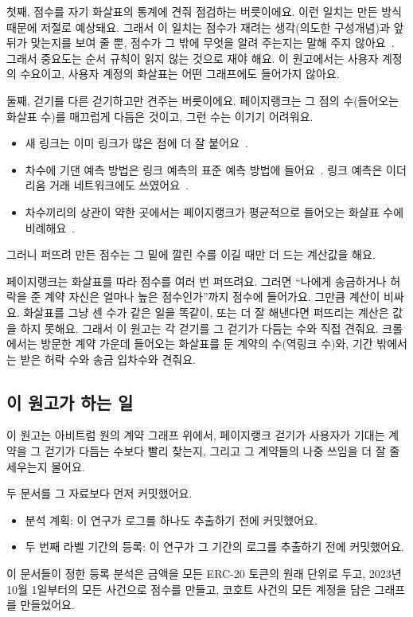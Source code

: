 첫째, 점수를 자기 화살표의 통계에 견줘 점검하는 버릇이에요. 이런 일치는 만든 방식 때문에 저절로 예상돼요. 그래서 이 일치는 점수가 재려는 생각(의도한 구성개념)과 앞뒤가 맞는지를 보여 줄 뿐, 점수가 그 밖에 무엇을 알려 주는지는 말해 주지 않아요~\cite{cronbach1955construct,messick1995validity}. 그래서 중요도는 순서 규칙이 읽지 않는 것으로 재야 해요. 이 원고에서는 사용자 계정의 수요이고, 사용자 계정의 화살표는 어떤 그래프에도 들어가지 않아요.

둘째, 걷기를 다른 걷기하고만 견주는 버릇이에요. 페이지랭크는 그 점의 수(들어오는 화살표 수)를 매끄럽게 다듬은 것이고, 그런 수는 이기기 어려워요.
\begin{itemize}
\item 새 링크는 이미 링크가 많은 점에 더 잘 붙어요~\cite{barabasi1999scaling,newman2001clustering}.
\item 차수에 기댄 예측 방법은 링크 예측의 표준 예측 방법에 들어요~\cite{libennowell2007link}. 링크 예측은 이더리움 거래 네트워크에도 쓰였어요~\cite{lin2022tracking}.
\item 차수끼리의 상관이 약한 곳에서는 페이지랭크가 평균적으로 들어오는 화살표 수에 비례해요~\cite{fortunato2008indegree}.
\end{itemize}
그러니 퍼뜨려 만든 점수는 그 밑에 깔린 수를 이길 때만 더 드는 계산값을 해요.

\begin{puri}
페이지랭크는 화살표를 따라 점수를 여러 번 퍼뜨려요. 그러면 “나에게 송금하거나 허락을 준 계약 자신은 얼마나 높은 점수인가”까지 점수에 들어가요. 그만큼 계산이 비싸요. 화살표를 그냥 센 수가 같은 일을 똑같이, 또는 더 잘 해낸다면 퍼뜨리는 계산은 값을 하지 못해요. 그래서 이 원고는 각 걷기를 그 걷기가 다듬는 수와 직접 견줘요. 크롤에서는 방문한 계약 가운데 들어오는 화살표를 둔 계약의 수(역링크 수)와, 기간 밖에서는 받은 허락 수와 송금 입차수와 견줘요.
\end{puri}

\subsection{이 원고가 하는 일}

이 원고는 아비트럼 원의 계약 그래프 위에서, 페이지랭크 걷기가 사용자가 기대는 계약을 그 걷기가 다듬는 수보다 빨리 찾는지, 그리고 그 계약들의 나중 쓰임을 더 잘 줄 세우는지 물어요.

두 문서를 그 자료보다 먼저 커밋했어요.
\begin{itemize}
\item 분석 계획: 이 연구가 로그를 하나도 추출하기 전에 커밋했어요.
\item 두 번째 라벨 기간의 등록: 이 연구가 그 기간의 로그를 추출하기 전에 커밋했어요.
\end{itemize}
이 문서들이 정한 등록 분석은 금액을 모든 ERC-20 토큰의 원래 단위로 두고, 2023년 10월 1일부터의 모든 사건으로 점수를 만들고, 코호트 사건의 모든 계정을 담은 그래프를 만들었어요.

